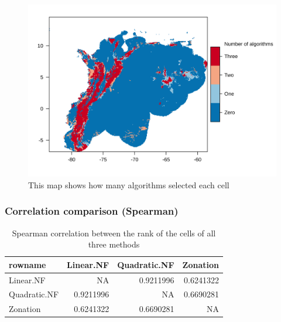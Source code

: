 \documentclass[]{article}
\begin{document}
\begin{figure}
\centering
\includegraphics{NFPaper_files/figure-latex/NumberOfTimes-1.png}
\caption{\label{fig:NumberOfTimes}This map shows how many algorithms selected each cell}
\end{figure}

\hypertarget{correlation-comparison-spearman}{%
\subsubsection{Correlation comparison (Spearman)}\label{correlation-comparison-spearman}}

\begin{table}

\caption{\label{tab:Corr}Spearman correlation between the rank of the cells of all three methods}
\centering
\begin{tabular}[t]{lrrr}
\toprule
rowname & Linear.NF & Quadratic.NF & Zonation\\
\midrule
Linear.NF & NA & 0.9211996 & 0.6241322\\
Quadratic.NF & 0.9211996 & NA & 0.6690281\\
Zonation & 0.6241322 & 0.6690281 & NA\\
\bottomrule
\end{tabular}
\end{table}
\end{document}
